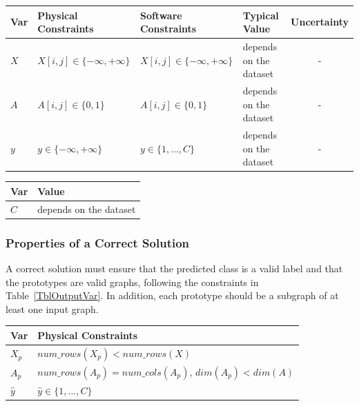 \documentclass[12pt]{article}
\begin{document}
\begin{table}[!h]
  \caption{Input Variables} \label{TblInputVar}
  \renewcommand{\arraystretch}{1.2}
\noindent \begin{longtable*}{l l l l c} 
  \toprule
  \textbf{Var} & \textbf{Physical Constraints} & \textbf{Software Constraints} &
                             \textbf{Typical Value} & \textbf{Uncertainty}\\
  \midrule 
  $X$ & $X[i,j] \in \{-\infty, +\infty\}$ & $X[i,j] \in \{-\infty, +\infty\}$ & depends on the dataset & - \\
  $A$ & $A[i,j] \in \{0, 1\}$ & $A[i,j] \in \{0, 1\}$ & depends on the dataset & - \\
  $y$ & $y \in \{-\infty, +\infty\}$ & $y \in \{1, ..., C\}$ & depends on the dataset & - \\

  \bottomrule
\end{longtable*}
\end{table}


\begin{table}[!h]
\caption{Specification Parameter Values} \label{TblSpecParams}
\renewcommand{\arraystretch}{1.2}
\noindent \begin{longtable*}{l l} 
  \toprule
  \textbf{Var} & \textbf{Value} \\
  \midrule 
  $C$ & depends on the dataset\\
  \bottomrule
\end{longtable*}
\end{table}

\subsubsection{Properties of a Correct Solution} \label{sec_CorrectSolution}

\noindent
A correct solution must ensure that the predicted class is a valid label and that the prototypes are valid graphs, following the constraints in Table~\ref{TblOutputVar}. In addition, each prototype should be a subgraph of at least one input graph.


\begin{table}[!h]
\caption{Output Variables} \label{TblOutputVar}
\renewcommand{\arraystretch}{1.2}
\noindent \begin{longtable*}{l l} 
  \toprule
  \textbf{Var} & \textbf{Physical Constraints} \\
  \midrule 
  $X_p$ & $num\_rows(X_p) < num\_rows(X)$ \\
  $A_p$ & $num\_rows(A_p) = num\_cols(A_p)$, $dim(A_p) < dim(A)$\\
  $\hat{y}$ & $\hat{y} \in \{1,...,C\}$ 
  \\
  \bottomrule
\end{longtable*}
\end{table}
\end{document}
